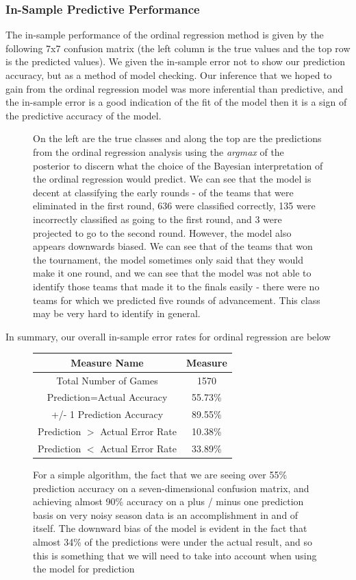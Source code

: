 \documentclass[10pt,a4paper, hidelinks]{article} %
\begin{document}
\subsubsection{In-Sample Predictive Performance}
The in-sample performance of the ordinal regression method is given by the following 7x7 confusion matrix (the left column is the true values and the top row is the predicted values). We given the in-sample error not to show our prediction accuracy, but as a method of model checking. Our inference that we hoped to gain from the ordinal regression model was more inferential than predictive, and the in-sample error is a good indication of the fit of the model then it is a sign of the predictive accuracy of the model. 
\begin{figure}[H]
	\centering
	
\caption{On the left are the true classes and along the top are the predictions from the ordinal regression analysis using the \textit{argmax} of the posterior to discern what the choice of the Bayesian interpretation of the ordinal regression would predict. We can see that the model is decent at classifying the early rounds - of the teams that were eliminated in the first round, 636 were classified correctly, 135 were incorrectly classified as going to the first round, and 3 were projected to go to the second round. However, the model also appears downwards biased. We can see that of the teams that won the tournament, the model sometimes only said that they would make it one round, and we can see that the model was not able to identify those teams that made it to the finals easily - there were no teams for which we predicted five rounds of advancement. This class may be very hard to identify in general.}
\end{figure}

In summary, our overall in-sample error rates for ordinal regression are below
\begin{figure}[H]
	\centering 
	\begin{tabular}{cc}
		\toprule
		Measure Name & Measure\\ 
		\midrule
		Total Number of Games & 1570\\ 
		Prediction=Actual Accuracy & 55.73\%\\ 
		+/- 1 Prediction Accuracy & 89.55\%\\ 
		Prediction $>$ Actual Error Rate & 10.38\%\\ 
		Prediction $<$ Actual Error Rate & 33.89\%\\ 
		\bottomrule
	\end{tabular}
	\caption{For a simple algorithm, the fact that we are seeing over 55\% prediction accuracy on a seven-dimensional confusion matrix, and achieving almost 90\% accuracy on a plus / minus one prediction basis on very noisy season data is an accomplishment in and of itself. The downward bias of the model is evident in the fact that almost 34\% of the predictions were under the actual result, and so this is something that we will need to take into account when using the model for prediction}
\end{figure}
\end{document}
